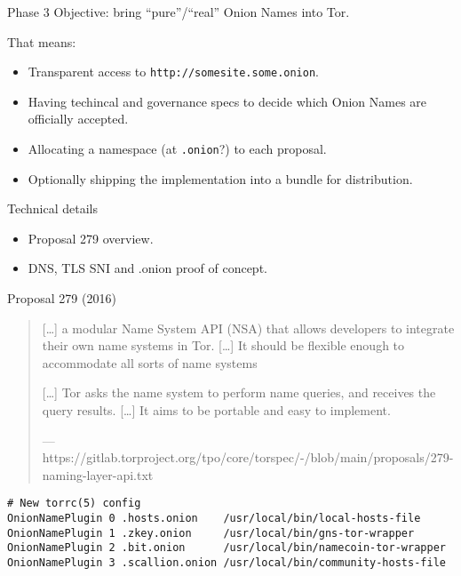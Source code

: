 \documentclass[
  ignorenonframetext,
]{beamer}
\providecommand{\tightlist}{%
  \setlength{\itemsep}{0pt}\setlength{\parskip}{0pt}}
\begin{document}
\begin{frame}[fragile]{Phase 3}
\protect\hypertarget{phase-3}{}
Objective: bring ``pure''/``real'' Onion Names into Tor.

That means:

\begin{itemize}
\tightlist
\item
  Transparent access to \texttt{http://somesite.some.onion}.
\item
  Having techincal and governance specs to decide which Onion Names are
  officially accepted.
\item
  Allocating a namespace (at \texttt{.onion}?) to each proposal.
\item
  Optionally shipping the implementation into a bundle for distribution.
\end{itemize}
\end{frame}

\begin{frame}{Technical details}
\protect\hypertarget{technical-details}{}
\begin{itemize}
\tightlist
\item
  Proposal 279 overview.
\item
  DNS, TLS SNI and .onion proof of concept.
\end{itemize}
\end{frame}

\begin{frame}[fragile]{Proposal 279 (2016)}
\protect\hypertarget{proposal-279-2016}{}
\begin{quote}
{[}\ldots{]} a modular Name System API (NSA) that allows developers to
integrate their own name systems in Tor. {[}\ldots{]} It should be
flexible enough to accommodate all sorts of name systems

{[}\ldots{]} Tor asks the name system to perform name queries, and
receives the query results. {[}\ldots{]} It aims to be portable and easy
to implement.

---
https://gitlab.torproject.org/tpo/core/torspec/-/blob/main/proposals/279-naming-layer-api.txt
\end{quote}

\begin{verbatim}
# New torrc(5) config
OnionNamePlugin 0 .hosts.onion    /usr/local/bin/local-hosts-file
OnionNamePlugin 1 .zkey.onion     /usr/local/bin/gns-tor-wrapper
OnionNamePlugin 2 .bit.onion      /usr/local/bin/namecoin-tor-wrapper
OnionNamePlugin 3 .scallion.onion /usr/local/bin/community-hosts-file
\end{verbatim}
\end{frame}
\end{document}
